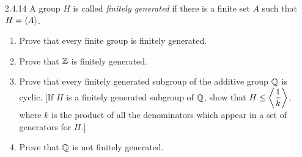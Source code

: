 \begin{enumerate}
      \textbf{Proof.} Let $\Q^+ = \left\{\D\frac{a}{b} : \text{$a$ and $b$ are
      positive integers}\right\}$ be the multiplicative group of positive
      rational numbers and $P = \left\{\D\frac{1}{p} : p
      \text{ is a prime}\right\}$. Clearly $\cyc{P} \subseteq \Q^+$, so it 
      suffices to show reverse containment. It is clear that $1 \in \cyc{P}$.
      Now consider $x/y \in \Q^+$. We shall now investigate the following cases:

      \textbf{Case 1.} $x = 1$ and $y > 1$. By the Fundamental Theorem of
      Arithmetic, there exist primes $p_1, p_2, \ldots, p_n$ such that
      $y = p_1p_2\cdots p_n$. Since $\cyc{P}$ is closed under multiplication, it
      follows that
      $$\frac{x}{y} = \frac{1}{y} = \frac{1}{p_1}\frac{1}{p_2}\cdots
        \frac{1}{p_n} \in \cyc{P}.$$

      \textbf{Case 2.} $x > 1$ and $y = 1$. By Case 1, we have that
      $y/x \in \cyc{P}$. By closure we have that $(y/x)^{-1} = x/y \in \cyc{P}$.

      \textbf{Case 3.} $x > 1$ and $y > 1$. By Case 1, we have that
      $1/y \in \cyc{P}$; by Case 2, we have that $x/1 \in \cyc{P}$; thus it
      follows by closure of $\cyc{P}$ that $(x/1)(1/y) = x/y \in \cyc{P}$.

      Thus we conclude that $\Q^+ \subseteq \cyc{P}$ so that $\Q^+ = \cyc{P}$.
      \qed
   \item[2.4.14]  A group $H$ is called \textit{finitely generated} if there is
                  a finite set $A$ such that $H = \langle A \rangle$.
                  \begin{enumerate}
                     \item Prove that every finite group is finitely generated.
                     \item Prove that $\mathbb{Z}$ is finitely generated.
                     \item Prove that every finitely generated subgroup of the
                           additive group $\mathbb{Q}$ is cyclic. [If $H$ is a finitely
                           generated subgroup of $\mathbb{Q}$, show that
                           $H \le \left\langle \displaystyle\frac{1}{k} \right\rangle$, where $k$ is the product
                           of all the denominators which appear in a set of
                           generators for $H$.]
                     \item Prove that $\mathbb{Q}$ is not finitely generated.
                  \end{enumerate}


\end{enumerate}
